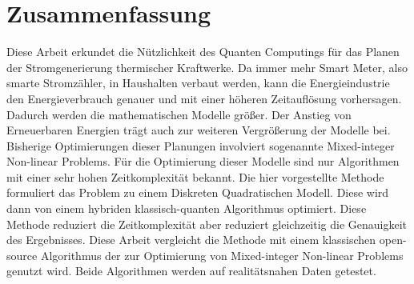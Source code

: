 \section*{Zusammenfassung}

Diese Arbeit erkundet die Nützlichkeit des Quanten Computings für das Planen der Stromgenerierung thermischer Kraftwerke.
Da immer mehr Smart Meter, also smarte Stromzähler, in Haushalten verbaut werden, kann die Energieindustrie den Energieverbrauch genauer und mit einer höheren Zeitauflösung vorhersagen.
Dadurch werden die mathematischen Modelle größer.
Der Anstieg von Erneuerbaren Energien trägt auch zur weiteren Vergrößerung der Modelle bei.
Bisherige Optimierungen dieser Planungen involviert sogenannte Mixed-integer Non-linear Problems.
Für die Optimierung dieser Modelle sind nur Algorithmen mit einer sehr hohen Zeitkomplexität bekannt.
Die hier vorgestellte Methode formuliert das Problem zu einem Diskreten Quadratischen Modell.
Diese wird dann von einem hybriden klassisch-quanten Algorithmus optimiert.
Diese Methode reduziert die Zeitkomplexität aber reduziert gleichzeitig die Genauigkeit des Ergebnisses.
Diese Arbeit vergleicht die Methode mit einem klassischen open-source Algorithmus der zur Optimierung von Mixed-integer Non-linear Problems genutzt wird.
Beide Algorithmen werden auf realitätsnahen Daten getestet.

